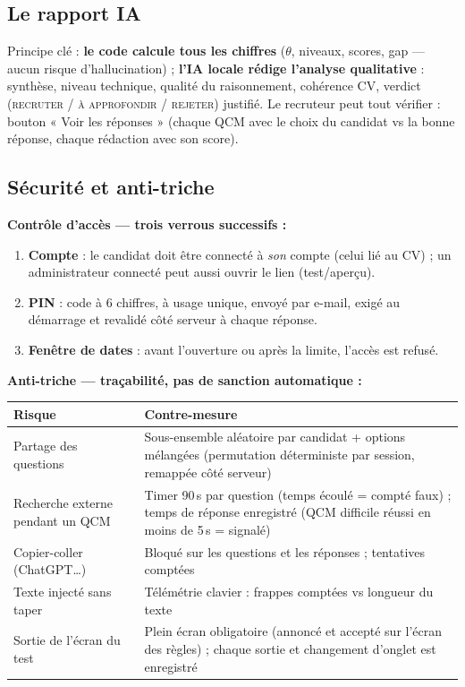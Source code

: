 \documentclass[11pt,a4paper]{article}
\begin{document}
\subsection{Le rapport IA}
Principe clé : \textbf{le code calcule tous les chiffres} ($\theta$, niveaux, scores,
gap --- aucun risque d'hallucination) ; \textbf{l'IA locale rédige l'analyse
qualitative} : synthèse, niveau technique, qualité du raisonnement, cohérence CV,
verdict (\textsc{recruter} / \textsc{à approfondir} / \textsc{rejeter}) justifié.
Le recruteur peut tout vérifier : bouton « Voir les réponses » (chaque QCM avec le
choix du candidat vs la bonne réponse, chaque rédaction avec son score).

\subsection{Sécurité et anti-triche}
\textbf{Contrôle d'accès --- trois verrous successifs :}
\begin{enumerate}
  \item \textbf{Compte} : le candidat doit être connecté à \emph{son} compte (celui lié
        au CV) ; un administrateur connecté peut aussi ouvrir le lien (test/aperçu).
  \item \textbf{PIN} : code à 6 chiffres, à usage unique, envoyé par e-mail, exigé au
        démarrage et revalidé côté serveur à chaque réponse.
  \item \textbf{Fenêtre de dates} : avant l'ouverture ou après la limite, l'accès est
        refusé.
\end{enumerate}

\textbf{Anti-triche --- traçabilité, pas de sanction automatique :}
\begin{center}
\begin{tabularx}{\textwidth}{p{5.2cm}X}
\toprule
\textbf{Risque} & \textbf{Contre-mesure} \\
\midrule
Partage des questions & Sous-ensemble aléatoire par candidat + options mélangées
(permutation déterministe par session, remappée côté serveur) \\
Recherche externe pendant un QCM & Timer 90\,s par question (temps écoulé = compté faux) ;
temps de réponse enregistré (QCM difficile réussi en moins de 5\,s = signalé) \\
Copier-coller (ChatGPT\ldots) & Bloqué sur les questions et les réponses ; tentatives comptées \\
Texte injecté sans taper & Télémétrie clavier : frappes comptées vs longueur du texte \\
Sortie de l'écran du test & Plein écran obligatoire (annoncé et accepté sur l'écran des
règles) ; chaque sortie et changement d'onglet est enregistré \\
\bottomrule
\end{tabularx}
\end{center}
\end{document}
